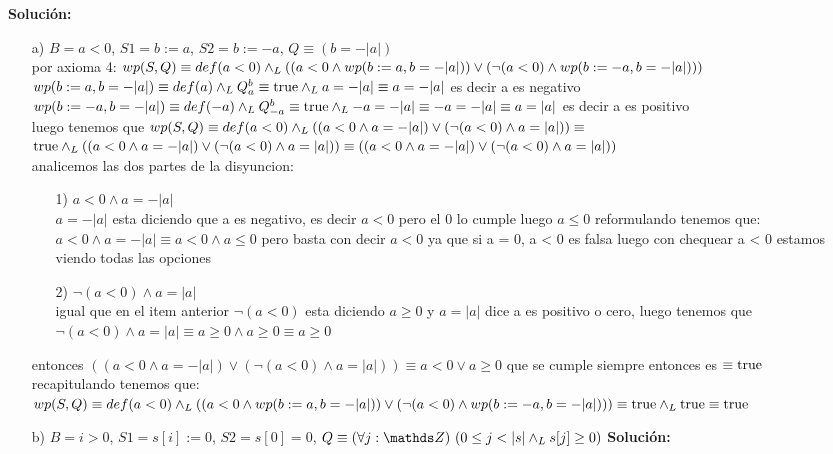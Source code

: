 \documentclass{article}
\begin{document}
\textbf{Soluci\'on:}
\begin{enumerate}
	\item [a)] $B = a < 0$, $S1 = b := a$, $S2 = b := -a$, $Q \equiv (b = -|a|)$\\
	por axioma 4: $wp(S,Q) \equiv def(a < 0) \land _L ((a < 0 \land wp(b := a, b = -|a|)) \lor (\lnot (a < 0) \land wp(b := -a, b = -|a|)))$\\
	$wp(b := a, b = -|a|) \equiv def(a) \land _L Q^{b}_{a} \equiv \mathrm{true} \land _L a = -|a| \equiv a = -|a|$ es decir a es negativo\\
	$wp(b := -a, b = -|a|) \equiv def(-a) \land _L Q^{b}_{-a} \equiv \mathrm{true} \land _L -a = -|a| \equiv -a = -|a| \equiv a = |a|$ es decir a es positivo\\
	luego tenemos que $wp(S,Q) \equiv def(a < 0) \land _L ((a < 0 \land a = -|a|) \lor (\lnot (a < 0) \land a = |a|)) \equiv$\\
	$\mathrm{true} \land _L ((a < 0 \land a = -|a|) \lor (\lnot (a < 0) \land a = |a|))
	\equiv ((a < 0 \land a = -|a|) \lor (\lnot (a < 0) \land a = |a|))$\\
	analicemos las dos partes de la disyuncion:
	\begin{itemize}
		\item [1)] $a < 0 \land a = -|a|$\\
		$a = -|a|$ esta diciendo que a es negativo, es decir $a<0$ pero el 0 lo cumple luego $a \leq 0$ reformulando tenemos que: $a < 0 \land a = -|a| \equiv a < 0 \land a \leq 0$ pero basta con decir $a < 0$ ya que si a = 0, a < 0 es falsa luego con chequear a < 0 estamos viendo todas las opciones
		\item [2)] $\lnot (a < 0) \land a = |a|$\\
		igual que en el item anterior $\lnot (a < 0)$ esta diciendo $a \geq 0$ y $a = |a|$ dice a es positivo o cero, luego tenemos que $ \lnot (a < 0) \land a = |a| \equiv a \geq 0 \land a \geq 0 \equiv a \geq 0$
	\end{itemize}
	entonces $((a < 0 \land a = -|a|) \lor (\lnot (a < 0) \land a = |a|)) \equiv a < 0 \lor a \geq 0$ que se cumple siempre entonces es $\equiv \mathrm{true}$\\
	recapitulando tenemos que: $wp(S,Q) \equiv def(a < 0) \land _L ((a < 0 \land wp(b := a, b = -|a|)) \lor (\lnot (a < 0) \land wp(b := -a, b = -|a|))) \equiv \\
	\mathrm{true} \land _L \mathrm{true} \equiv \mathrm{true}$

	\item [b)] $B = i > 0$, $S1 = s[i] := 0$, $S2 = s[0] = 0$, $Q \equiv \paraTodo[unalinea]{j}{\ent}{0 \leq j < |s| \yLuego s[j] \geq 0}$
	\textbf{Soluci\'on:}

\end{enumerate}
\end{document}
